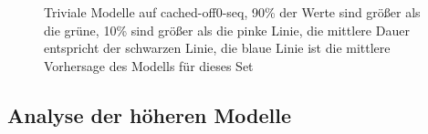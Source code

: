 \documentclass[
	12pt,
	a4paper,
	BCOR10mm,
	DIV14,
	listof=totoc,
	bibliography=totoc,
	headsepline
]{scrreprt}
\begin{document}
\begin{figure}
 	\caption{Triviale Modelle auf cached-off0-seq, 90\% der Werte sind größer als die grüne, 10\% sind größer als die pinke Linie, die mittlere Dauer entspricht der schwarzen Linie, die blaue Linie ist die mittlere Vorhersage des Modells für dieses Set}
 	\label{fig:densities_baselines_seq}
 \end{figure} 

\clearpage

\subsection{Analyse der höheren Modelle}
\end{document}
